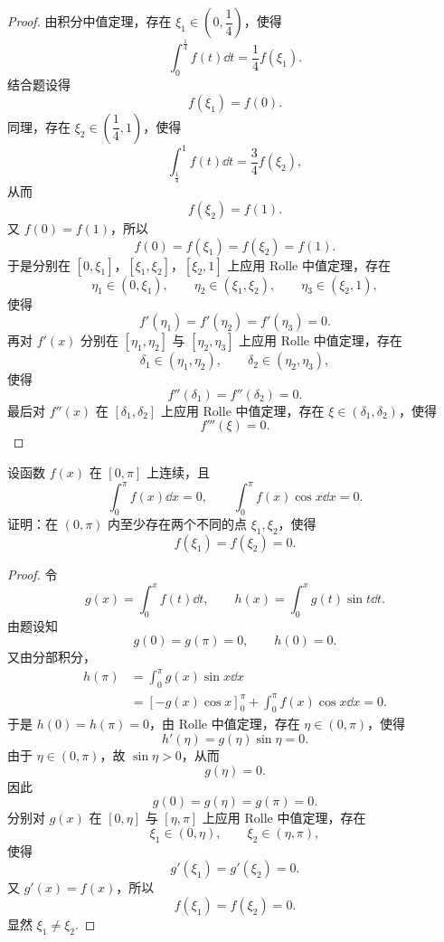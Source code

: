 \begin{proof}
	由积分中值定理，存在 $\xi_1\in\left(0,\dfrac14\right)$，使得
	\[
	\int_0^{\frac14}f(t)\dd t=\frac14 f(\xi_1).
	\]
	结合题设得
	\[
	f(\xi_1)=f(0).
	\]
	同理，存在 $\xi_2\in\left(\dfrac14,1\right)$，使得
	\[
	\int_{\frac14}^{1}f(t)\dd t=\frac34 f(\xi_2),
	\]
	从而
	\[
	f(\xi_2)=f(1).
	\]
	又 $f(0)=f(1)$，所以
	\[
	f(0)=f(\xi_1)=f(\xi_2)=f(1).
	\]
	于是分别在 $[0,\xi_1]$，$[\xi_1,\xi_2]$，$[\xi_2,1]$ 上应用 Rolle 中值定理，存在
	\[
	\eta_1\in(0,\xi_1),\qquad
	\eta_2\in(\xi_1,\xi_2),\qquad
	\eta_3\in(\xi_2,1),
	\]
	使得
	\[
	f'(\eta_1)=f'(\eta_2)=f'(\eta_3)=0.
	\]
	再对 $f'(x)$ 分别在 $[\eta_1,\eta_2]$ 与 $[\eta_2,\eta_3]$ 上应用 Rolle 中值定理，存在
	\[
	\delta_1\in(\eta_1,\eta_2),
	\qquad
	\delta_2\in(\eta_2,\eta_3),
	\]
	使得
	\[
	f''(\delta_1)=f''(\delta_2)=0.
	\]
	最后对 $f''(x)$ 在 $[\delta_1,\delta_2]$ 上应用 Rolle 中值定理，存在 $\xi\in(\delta_1,\delta_2)$，使得
	\[
	f'''(\xi)=0.
	\]
\end{proof}

\begin{problem}
	设函数 $f(x)$ 在 $[0,\pi]$ 上连续，且
	\[
	\int_0^\pi f(x)\dd x=0,
	\qquad
	\int_0^\pi f(x)\cos x\dd x=0.
	\]
	证明：在 $(0,\pi)$ 内至少存在两个不同的点 $\xi_1,\xi_2$，使得
	\[
	f(\xi_1)=f(\xi_2)=0.
	\]
\end{problem}

\begin{proof}
	令
	\[
	g(x)=\int_0^x f(t)\dd t,
	\qquad
	h(x)=\int_0^x g(t)\sin t\dd t.
	\]
	由题设知
	\[
	g(0)=g(\pi)=0,
	\qquad
	h(0)=0.
	\]
	又由分部积分，
	\[
	\begin{aligned}
		h(\pi)
		&=\int_0^\pi g(x)\sin x\dd x \\
		&=\left[-g(x)\cos x\right]_0^\pi+
		\int_0^\pi f(x)\cos x\dd x=0.
	\end{aligned}
	\]
	于是 $h(0)=h(\pi)=0$，由 Rolle 中值定理，存在 $\eta\in(0,\pi)$，使得
	\[
	h'(\eta)=g(\eta)\sin\eta=0.
	\]
	由于 $\eta\in(0,\pi)$，故 $\sin\eta>0$，从而
	\[
	g(\eta)=0.
	\]
	因此
	\[
	g(0)=g(\eta)=g(\pi)=0.
	\]
	分别对 $g(x)$ 在 $[0,\eta]$ 与 $[\eta,\pi]$ 上应用 Rolle 中值定理，存在
	\[
	\xi_1\in(0,\eta),
	\qquad
	\xi_2\in(\eta,\pi),
	\]
	使得
	\[
	g'(\xi_1)=g'(\xi_2)=0.
	\]
	又 $g'(x)=f(x)$，所以
	\[
	f(\xi_1)=f(\xi_2)=0.
	\]
	显然 $\xi_1\neq\xi_2$.
\end{proof}

